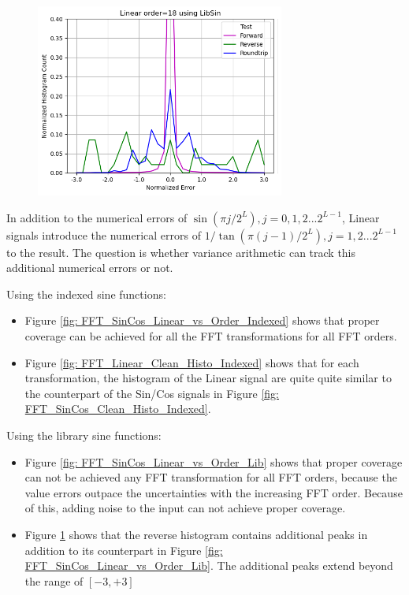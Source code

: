 \documentclass[twoside]{article}
\numberwithin{equation}{section}
\begin{document}
\begin{figure}[p]
\centering
\includegraphics[height=2.5in]{FFT_Linear_Clean_Histo_Lib.png} 
\label{fig: FFT_Linear_Clean_Histo_Lib}
\end{figure}

In addition to the  numerical errors of $\sin(\pi j /2^L), j = 0, 1, 2 ... 2^{L-1}$, Linear signals introduce the numerical errors of $1/\tan(\pi (j - 1) /2^L), j = 1, 2 ... 2^{L-1}$ to the result.
The question is whether variance arithmetic can track this additional numerical errors or not.

Using the indexed sine functions:
\begin{itemize}
\item Figure \ref{fig: FFT_SinCos_Linear_vs_Order_Indexed} shows that proper coverage can be achieved for all the FFT transformations for all FFT orders.

\item Figure \ref{fig: FFT_Linear_Clean_Histo_Indexed} shows that for each transformation, the histogram of the Linear signal are quite quite similar to the counterpart of the Sin/Cos signals in Figure \ref{fig: FFT_SinCos_Clean_Histo_Indexed}. 

\end{itemize}
 
Using the library sine functions:
\begin{itemize}
\item Figure \ref{fig: FFT_SinCos_Linear_vs_Order_Lib} shows that proper coverage can not be achieved any FFT transformation for all FFT orders, because the value errors outpace the uncertainties with the increasing FFT order.
Because of this, adding noise to the input can not achieve proper coverage.

\item Figure \ref{fig: FFT_Linear_Clean_Histo_Lib} shows that the reverse histogram contains additional peaks in addition to its counterpart in Figure \ref{fig: FFT_SinCos_Linear_vs_Order_Lib}.
The additional peaks extend beyond the range of $[-3, +3]$

\end{itemize}
\end{document}
